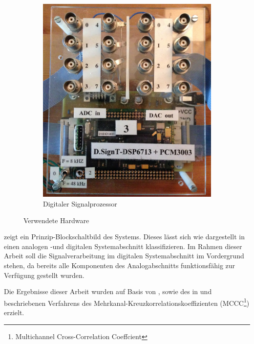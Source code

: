\begin{figure}
\begin{subfigure}[b]{0.48\textwidth}
                \includegraphics[width=\textwidth]{grafiken/01_Einfuehrung/Foto_DSP}
                \caption{Digitaler Signalprozessor}
                \label{fig:Foto_DSP}
        \end{subfigure}
        \caption{Verwendete Hardware}
\end{figure}



 zeigt ein Prinzip-Blockschaltbild des Systems. Dieses lässt sich wie dargestellt in einen analogen -und digitalen Systemabschnitt klassifizieren. Im Rahmen dieser Arbeit soll die Signalverarbeitung im digitalen Systemabschnitt im Vordergrund stehen, da bereits alle Komponenten des Analogabschnitts funktionsfähig zur Verfügung gestellt wurden.

Die Ergebnisse dieser Arbeit wurden auf Basis von \citet{Master_Array_Pikora}, \citet{Master_Array_Mueller} sowie des in \citet[S. 196ff]{Book_Array_Benesty} und \citet{Paper_Array_Benesty} beschriebenen Verfahrens des Mehrkanal-Kreuzkorrelationskoeffizienten (MCCC\footnote{Multichannel Cross-Correlation Coeffcient}) erzielt.


